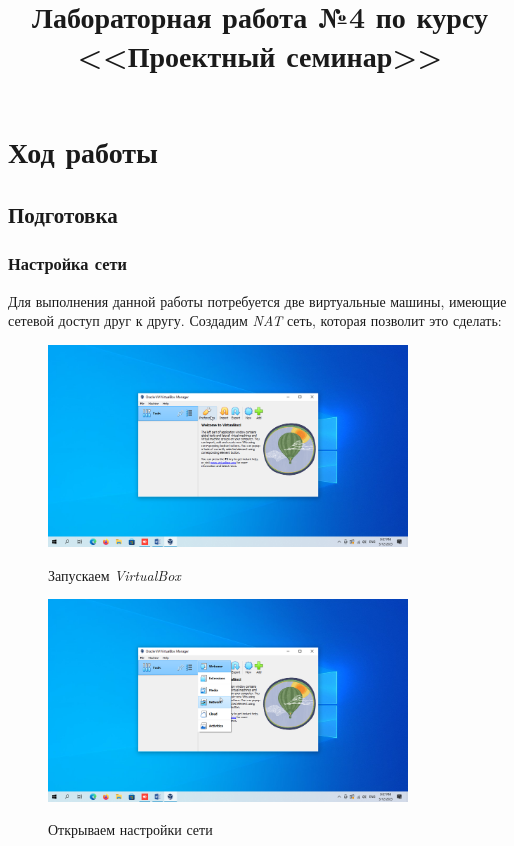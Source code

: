 \documentclass[a4paper]{article}
\title{
  Лабораторная работа №4 по курсу \\
  <<Проектный семинар>>  
}
\begin{document}
  \templatedtitlepage
  
  \toc

  \section{Ход работы}

  \subsection{Подготовка}

  \subsubsection{Настройка сети}

  Для выполнения данной работы потребуется две виртуальные машины, имеющие сетевой доступ
  друг к другу. Создадим \textit{NAT} сеть, которая позволит это сделать:

  \begin{figure}[H]
    \centering
    \includegraphics[width=0.85\textwidth]{04_0000}
    \label{img:0}
    \caption{Запускаем \textit{VirtualBox}}
  \end{figure}

  \begin{figure}[H]
    \centering
    \includegraphics[width=0.85\textwidth]{04_0001}
    \label{img:1}
    \caption{Открываем настройки сети}
  \end{figure}
\end{document}
